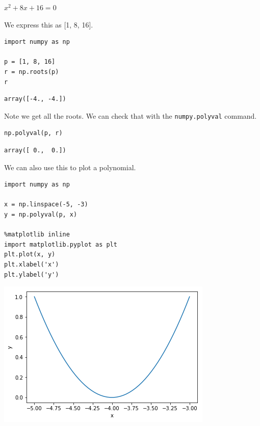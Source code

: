 \documentclass[11pt]{article}
\begin{document}
\(x^2 + 8x + 16 = 0\)

We express this as [1, 8, 16].

\begin{verbatim}
import numpy as np

p = [1, 8, 16]
r = np.roots(p)
r
\end{verbatim}

\begin{verbatim}
array([-4., -4.])
\end{verbatim}

Note we get all the roots. We can check that with the \texttt{numpy.polyval} command.

\begin{verbatim}
np.polyval(p, r)
\end{verbatim}

\begin{verbatim}
array([ 0.,  0.])
\end{verbatim}

We can also use this to plot a polynomial.

\begin{verbatim}
import numpy as np

x = np.linspace(-5, -3)
y = np.polyval(p, x)

%matplotlib inline
import matplotlib.pyplot as plt
plt.plot(x, y)
plt.xlabel('x')
plt.ylabel('y')
\end{verbatim}







\begin{center}
\includegraphics[width=.9\linewidth]{obipy-resources/2cebf4017bd84c109f67e80d93d1304b-17111_sX.png}
\end{center}
\end{document}
